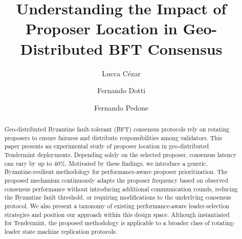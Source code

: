 \documentclass[runningheads]{llncs}
\begin{document}
%
\title{
Understanding the Impact of Proposer Location in Geo-Distributed BFT Consensus
}
%
%
\author{Lucca Cézar \and
Fernando Dotti \and
Fernando Pedone}
%
%
%
\maketitle              %
%
\begin{abstract}

Geo-distributed Byzantine fault-tolerant (BFT) consensus protocols rely on rotating proposers to ensure fairness and distribute responsibilities among validators. 
This paper presents an experimental study of proposer location in geo-distributed Tendermint deployments. 
Depending solely on the selected proposer, consensus latency can vary by up to 40\%. 
Motivated by these findings, we introduce a generic, Byzantine-resilient methodology for performance-aware proposer prioritization. 
The proposed mechanism continuously adapts the proposer frequency based on observed consensus performance without introducing additional communication rounds, reducing the Byzantine fault threshold, or requiring modifications to the underlying consensus protocol. 
We also present a taxonomy of existing performance-aware leader-selection strategies and position our approach within this design space. 
Although instantiated for Tendermint, the proposed methodology is applicable to a broader class of rotating-leader state machine replication protocols.

\end{abstract}





%

\end{document}
